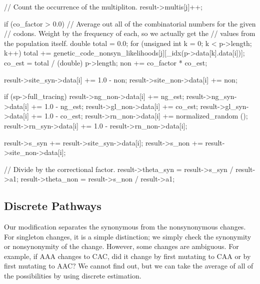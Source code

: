 \documentclass{article}
\begin{document}
\begin{ccode}
{{{{	 // Count the occurrence of the multipliton.
	 result->multis[j]++;

	 if (co_factor > 0.0) {
	   // Average out all of the combinatorial numbers for the given
	   // codons. Weight by the frequency of each, so we actually get the
	   // values from the population itself.
	   double total = 0.0;
	   for (unsigned int k = 0; k < p->length; k++)
	     total += genetic_code_nonsyn_likelihoods[j][_idx(p->data[k].data[i])];
	   co_est = total / (double) p->length;
	   non += co_factor * co_est;
	 }

	 result->site_syn->data[i] += 1.0 - non;
	 result->site_non->data[i] += non;

	 if (sp->full_tracing) {
	   result->ng_non->data[i]  += ng_est;
	   result->ng_syn->data[i]  += 1.0 - ng_est;
	   result->gl_non->data[i]  += co_est;
	   result->gl_syn->data[i]  += 1.0 - co_est;
	   result->rn_non->data[i]  += normalized_random ();
	   result->rn_syn->data[i]  += 1.0 - result->rn_non->data[i];
	 }
       }
    }
    
    result->s_syn += result->site_syn->data[i];
    result->s_non += result->site_non->data[i];
  }

  // Divide by the correctional factor.
  result->theta_syn = result->s_syn / result->a1;
  result->theta_non = result->s_non / result->a1;
}
\end{ccode}

    \subsection{Discrete Pathways}
      \label{sec:pathways}

      Our modification separates the synonymous from the nonsynonymous changes.
      For singleton changes, it is a simple distinction; we simply check the
      synonymity or nonsynonymity of the change. However, some changes are
      ambiguous. For example, if AAA changes to CAC, did it change by first
      mutating to CAA or by first mutating to AAC? We cannot find out, but we
      can take the average of all of the possibilities by using discrete
      estimation.
\end{document}
